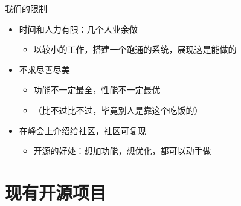 \documentclass[aspectratio=169]{ctexbeamer}
\begin{document}
\begin{frame}{我们的限制}
  \begin{itemize}
    \item 时间和人力有限：几个人业余做\begin{itemize}
      \item 以较小的工作，搭建一个跑通的系统，展现这是能做的
    \end{itemize}
    \item 不求尽善尽美\begin{itemize}
      \item 功能不一定最全，性能不一定最优
      \item （比不过比不过，毕竟别人是靠这个吃饭的）
    \end{itemize}
    \item 在峰会上介绍给社区，社区可复现\begin{itemize}
      \item 开源的好处：想加功能，想优化，都可以动手做
    \end{itemize}
  \end{itemize}
\end{frame}

\section{现有开源项目}
\end{document}
